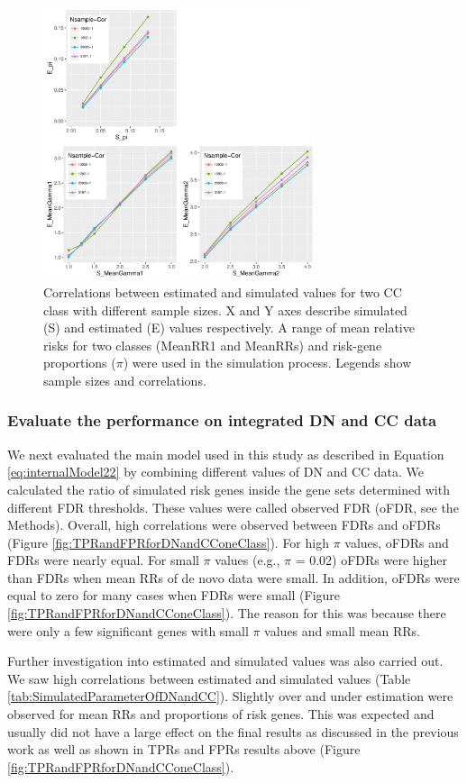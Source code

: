 \documentclass[]{article}
\begin{document}
\begin{figure}[ht]
\centering
\includegraphics[width=\textwidth,height=8cm]{Picture/PUB2OnlyCCnSample.pdf}
\caption{Correlations between estimated and simulated values for two
  CC class with different sample sizes.  X and Y axes describe simulated (S) and estimated (E)
  values respectively. A range of mean relative risks for two classes
  (MeanRR1 and MeanRRs) and risk-gene proportions ($\pi$) were used in
  the simulation process.  Legends show sample sizes and correlations.}
\label{tab:CorrelationTwoClassCC}
\end{figure}

\subsubsection{Evaluate the performance on integrated DN and CC data}

We next evaluated the main model used in this study as described in Equation
\ref{eq:internalModel22} by combining different values of DN and CC data.
We calculated the ratio of simulated risk genes inside the gene
sets determined with different FDR thresholds. These values were
called observed FDR (oFDR, see the Methods). Overall, high
correlations were observed between FDRs and oFDRs (Figure
\ref{fig:TPRandFPRforDNandCConeClass}). For high $\pi$ values, oFDRs
and FDRs were nearly equal. For small $\pi$ values (e.g., $\pi$ =
0.02) oFDRs were higher than FDRs when mean RRs of de novo data were
small. In addition, oFDRs were equal to zero for many cases when
FDRs were small (Figure \ref{fig:TPRandFPRforDNandCConeClass}). The reason for this was because there were only a few
significant genes with small $\pi$ values and small mean
RRs.


Further investigation into estimated and simulated values was also
carried out. We saw high correlations between estimated and simulated
values (Table \ref{tab:SimulatedParameterOfDNandCC}).
Slightly over and under estimation were observed for mean RRs and
proportions of risk genes. This was
expected and usually did not have a large effect on the final results as discussed
in the previous work \citep{he2013integrated} as well as shown in TPRs
and FPRs results above (Figure \ref{fig:TPRandFPRforDNandCConeClass}).
\end{document}

